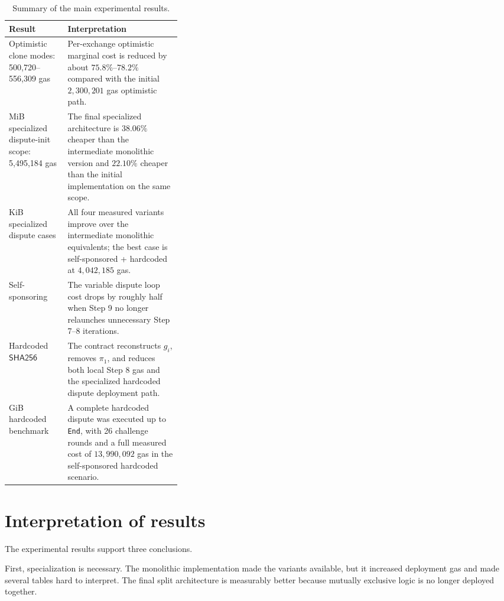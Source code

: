 \begin{table}[htbp]
  \centering
  \small
  \begin{tabularx}{\linewidth}{>{\raggedright\arraybackslash}p{0.34\linewidth}>{\raggedright\arraybackslash}X}
    \toprule
    Result & Interpretation \\
    \midrule
    Optimistic clone modes: 500,720--556,309 gas &
    Per-exchange optimistic marginal cost is reduced by about \(75.8\%\)--\(78.2\%\)
    compared with the initial \(2,300,201\) gas optimistic path. \\
    4 MiB specialized dispute-init scope: 5,495,184 gas &
    The final specialized architecture is \(38.06\%\) cheaper than the intermediate monolithic
    version and \(22.10\%\) cheaper than the initial implementation on the same scope. \\
    16 KiB specialized dispute cases &
    All four measured variants improve over the intermediate monolithic equivalents; the best
    case is self-sponsored + hardcoded at \(4,042,185\) gas. \\
    Self-sponsoring &
    The variable dispute loop cost drops by roughly half when Step 9 no longer relaunches
    unnecessary Step 7--8 iterations. \\
    Hardcoded \(\mathsf{SHA256}\) &
    The contract reconstructs \(g_i\), removes \(\pi_1\), and reduces both local Step 8 gas
    and the specialized hardcoded dispute deployment path. \\
    1 GiB hardcoded benchmark &
    A complete hardcoded dispute was executed up to \texttt{End}, with 26 challenge rounds
    and a full measured cost of \(13,990,092\) gas in the self-sponsored hardcoded scenario. \\
    \bottomrule
  \end{tabularx}
  \caption{Summary of the main experimental results.}
  \label{tab:experimental-summary}
\end{table}

\section{Interpretation of results}

The experimental results support three conclusions.

First, specialization is necessary. The monolithic implementation made the variants
available, but it increased deployment gas and made several tables hard to interpret. The
final split architecture is measurably better because mutually exclusive logic is no longer
deployed together.

